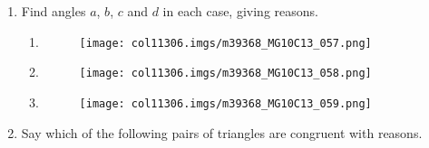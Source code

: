\begin{enumerate}[noitemsep, label=\textbf{\arabic*}. ]
\begin{enumerate}[noitemsep, label=\textbf{\alph*}. ]
\begin{figure}[H]
 \end{figure}       
        \end{enumerate}
        \label{m39368*uid116}\item Find angles $a$, $b$, $c$ and $d$ in each case, giving reasons.
\label{m39368*id320255}\begin{enumerate}[noitemsep, label=\textbf{\alph*}. ] 
            \label{m39368*uid117}\item 
    \setcounter{subfigure}{0}
	\begin{figure}[H] %
    \begin{center}
    \label{m39368*id320271!!!underscore!!!media}\label{m39368*id320271!!!underscore!!!printimage}\texttt{[image: col11306.imgs/m39368\_MG10C13\_057.png]} %
      \vspace{2pt}
    \vspace{.1in}
    \end{center}
 \end{figure}       \label{m39368*uid118}\item 
    \setcounter{subfigure}{0}
	\begin{figure}[H] %
    \begin{center}
    \label{m39368*id320290!!!underscore!!!media}\label{m39368*id320290!!!underscore!!!printimage}\texttt{[image: col11306.imgs/m39368\_MG10C13\_058.png]} %
      \vspace{2pt}
    \vspace{.1in}
    \end{center}
 \end{figure}       \label{m39368*uid119}\item 
    \setcounter{subfigure}{0}
	\begin{figure}[H] %
    \begin{center}
    \label{m39368*id320310!!!underscore!!!media}\label{m39368*id320310!!!underscore!!!printimage}\texttt{[image: col11306.imgs/m39368\_MG10C13\_059.png]} %
      \vspace{2pt}
    \vspace{.1in}
    \end{center}
 \end{figure}       \end{enumerate}
\label{m39368*uid126}\item Say which of the following pairs of triangles are congruent with reasons.

\end{enumerate}
